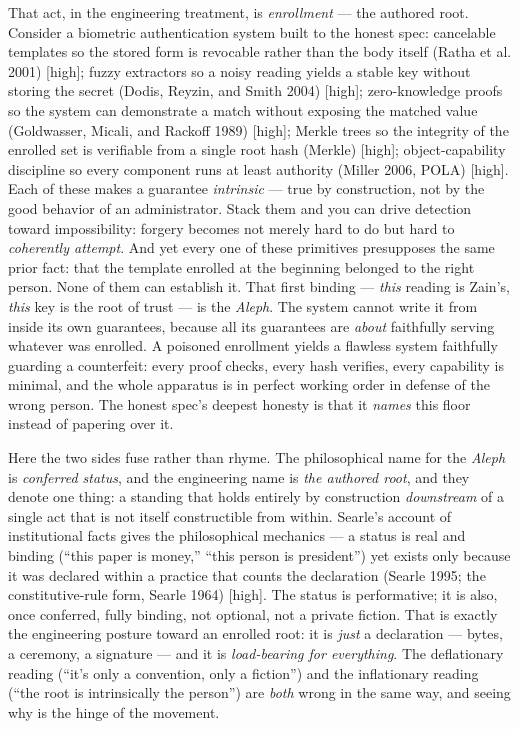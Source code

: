 \documentclass[11pt]{article}
\begin{document}
That act, in the engineering treatment, is \emph{enrollment} — the authored root. Consider a biometric authentication system built to the honest spec: cancelable templates so the stored form is revocable rather than the body itself (Ratha et al. 2001) [high]; fuzzy extractors so a noisy reading yields a stable key without storing the secret (Dodis, Reyzin, and Smith 2004) [high]; zero-knowledge proofs so the system can demonstrate a match without exposing the matched value (Goldwasser, Micali, and Rackoff 1989) [high]; Merkle trees so the integrity of the enrolled set is verifiable from a single root hash (Merkle) [high]; object-capability discipline so every component runs at least authority (Miller 2006, POLA) [high]. Each of these makes a guarantee \emph{intrinsic} — true by construction, not by the good behavior of an administrator. Stack them and you can drive detection toward impossibility: forgery becomes not merely hard to do but hard to \emph{coherently attempt}. And yet every one of these primitives presupposes the same prior fact: that the template enrolled at the beginning belonged to the right person. None of them can establish it. That first binding — \emph{this} reading is Zain's, \emph{this} key is the root of trust — is the \emph{Aleph}. The system cannot write it from inside its own guarantees, because all its guarantees are \emph{about} faithfully serving whatever was enrolled. A poisoned enrollment yields a flawless system faithfully guarding a counterfeit: every proof checks, every hash verifies, every capability is minimal, and the whole apparatus is in perfect working order in defense of the wrong person. The honest spec's deepest honesty is that it \emph{names} this floor instead of papering over it.

Here the two sides fuse rather than rhyme. The philosophical name for the \emph{Aleph} is \emph{conferred status}, and the engineering name is \emph{the authored root}, and they denote one thing: a standing that holds entirely by construction \emph{downstream} of a single act that is not itself constructible from within. Searle's account of institutional facts gives the philosophical mechanics — a status is real and binding (``this paper is money,'' ``this person is president'') yet exists only because it was declared within a practice that counts the declaration (Searle 1995; the constitutive-rule form, Searle 1964) [high]. The status is performative; it is also, once conferred, fully binding, not optional, not a private fiction. That is exactly the engineering posture toward an enrolled root: it is \emph{just} a declaration — bytes, a ceremony, a signature — and it is \emph{load-bearing for everything}. The deflationary reading (``it's only a convention, only a fiction'') and the inflationary reading (``the root is intrinsically the person'') are \emph{both} wrong in the same way, and seeing why is the hinge of the movement.
\end{document}
